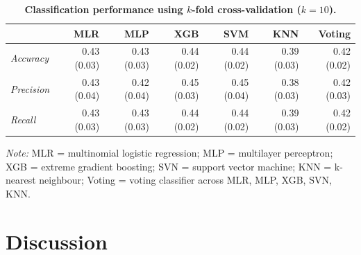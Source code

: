 \documentclass[10pt,letterpaper]{article}
\begin{document}
{{\begin{table}[!ht]
\begin{adjustwidth}{-7mm}{0in} %
\centering
\caption{\bf Classification performance using $k$-fold cross-validation ($k=10$).} 
\vspace{5mm}
\begin{tabular}{|lrrrrrr|}
\hline
 & MLR & MLP & XGB & SVM & KNN & Voting\\\hline
 \emph{Accuracy} &0.43 (0.03) & 0.43 (0.03) &0.44 (0.02) &0.44 (0.02) & 0.39 (0.03) & 0.42 (0.02)\\
 \emph{Precision} & 0.43 (0.04) & 0.42 (0.04) & 0.45 (0.03) & 0.45 (0.04) & 0.38 (0.03) & 0.42 (0.03)\\
 \emph{Recall} & 0.43 (0.03) & 0.43 (0.03) & 0.44 (0.02) & 0.44 (0.02) & 0.39 (0.03) & 0.42 (0.02) \\
 \hline
\end{tabular} 
\label{crossvalidation}
\end{adjustwidth}
\vspace{2mm}

\textit{Note:} MLR = multinomial logistic regression; MLP = multilayer perceptron; XGB = extreme gradient boosting; SVN = support vector machine; 
KNN = k-nearest neighbour; Voting = voting classifier across MLR, MLP, XGB, SVN, KNN. \\ 

\end{table}

\section*{Discussion}
}}
\end{document}
